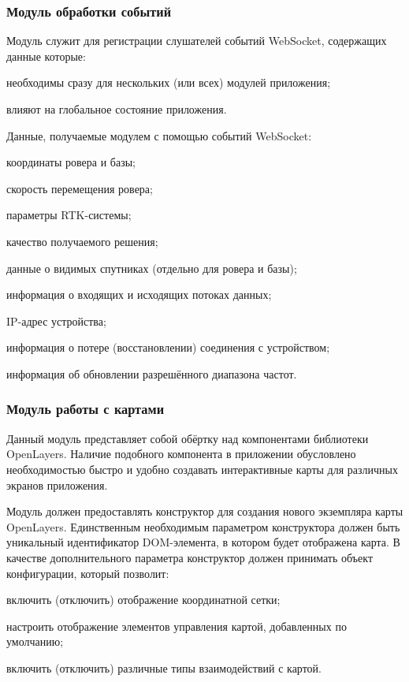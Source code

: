 \subsubsection{Модуль обработки событий}

Модуль служит для регистрации слушателей событий WebSocket, содержащих данные которые:
\begin{dashitemize}
  \item необходимы сразу для нескольких (или всех) модулей приложения;
  \item влияют на глобальное состояние приложения.
\end{dashitemize}

Данные, получаемые модулем с помощью событий WebSocket:
\begin{dashitemize}
  \item координаты ровера и базы;
  \item скорость перемещения ровера;
  \item параметры RTK-системы;
  \item качество получаемого решения;
  \item данные о видимых спутниках (отдельно для ровера и базы);
  \item информация о входящих и исходящих потоках данных;
  \item IP-адрес устройства;
  \item информация о потере (восстановлении) соединения с устройством;
  \item информация об обновлении разрешённого диапазона частот.
\end{dashitemize}


\subsubsection{Модуль работы с картами}

Данный модуль представляет собой обёртку над компонентами библиотеки OpenLayers. Наличие подобного компонента в приложении обусловлено необходимостью быстро и удобно создавать интерактивные карты для различных экранов приложения.

Модуль должен предоставлять конструктор для создания нового экземпляра карты OpenLayers. Единственным необходимым параметром конструктора должен быть уникальный идентификатор DOM-элемента, в котором будет отображена карта. В качестве дополнительного параметра конструктор должен принимать объект конфигурации, который позволит:
\begin{dashitemize}
  \item включить (отключить) отображение координатной сетки;
  \item настроить отображение элементов управления картой, добавленных по умолчанию;
  \item включить (отключить) различные типы взаимодействий с картой.
\end{dashitemize}


